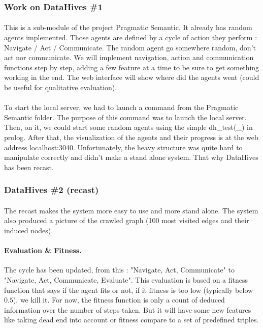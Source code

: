 \documentclass{article}
\begin{document}
		\subsubsection{Work on DataHives \#1}
			\paragraph{} This is a sub-module of the project Pragmatic Semantic.
			It already has random agents implemented.
			Those agents are defined by a cycle of action they perform : Navigate / Act / Communicate.
			The random agent go somewhere random, don't act nor communicate.
			We will implement navigation, action and communication functions step by step,
			adding a few feature at a time to be sure to get something working in the end.
			The web interface will show where did the agents went (could be useful for qualitative evaluation).
			\paragraph{} To start the local server, we had to launch a command from the Pragmatic Semantic folder.
			The purpose of this command was to launch the local server.
			Then, on it, we could start some random agents using the simple dh\_test(\_) in prolog.
			After that, the visualization of the agents and their progress is at the web address localhost:3040.
			Unfortunately, the heavy structure was quite hard to manipulate correctly and didn't make a stand alone system.
			That why DataHives has been recast.
		\subsubsection{DataHives \#2 (recast)}
			\paragraph{} The recast makes the system more easy to use and more stand alone.
				The system also produced a picture of the crawled graph (100 most visited edges and their induced nodes).
			\paragraph{Evaluation \& Fitness.} The cycle has been updated, from this :
				"Navigate, Act, Communicate" to "Navigate, Act, Communicate, Evaluate".
				This evaluation is based on a fitness function that says if the agent fits or not,
				if it fitness is too low (typically below $0.5$), we kill it.
				For now, the fitness function is only a count of deduced information over the number of steps taken.
				But it will have some new features like taking dead end into account or
				fitness compare to a set of predefined triples.
\end{document}
